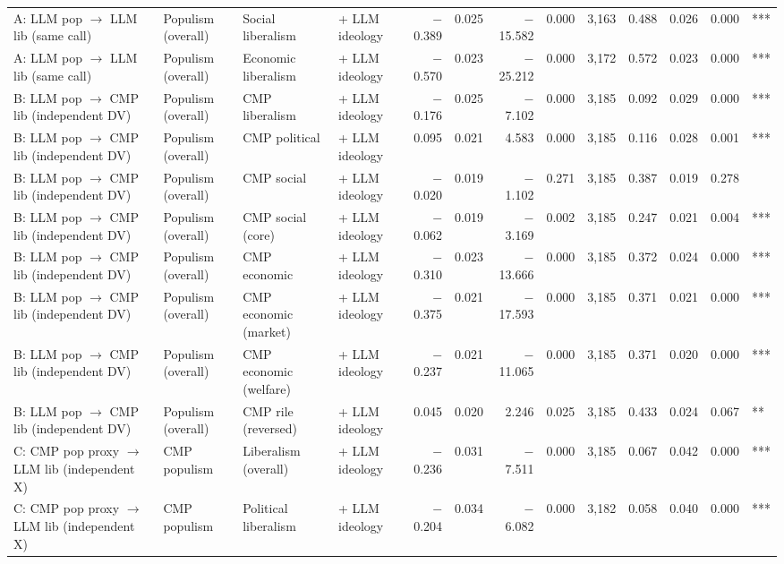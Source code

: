 \begin{table}[ht]
{\begin{tabular}{llllrrrrrrrrl}
A: LLM pop $\rightarrow$ LLM lib (same call) & Populism (overall) & Social liberalism & + LLM ideology & $-$0.389 & 0.025 & $-$15.582 & 0.000 & 3,163 & 0.488 & 0.026 & 0.000 & *** \\
A: LLM pop $\rightarrow$ LLM lib (same call) & Populism (overall) & Economic liberalism & + LLM ideology & $-$0.570 & 0.023 & $-$25.212 & 0.000 & 3,172 & 0.572 & 0.023 & 0.000 & *** \\
B: LLM pop $\rightarrow$ CMP lib (independent DV) & Populism (overall) & CMP liberalism & + LLM ideology & $-$0.176 & 0.025 & $-$7.102 & 0.000 & 3,185 & 0.092 & 0.029 & 0.000 & *** \\
B: LLM pop $\rightarrow$ CMP lib (independent DV) & Populism (overall) & CMP political & + LLM ideology & 0.095 & 0.021 & 4.583 & 0.000 & 3,185 & 0.116 & 0.028 & 0.001 & *** \\
B: LLM pop $\rightarrow$ CMP lib (independent DV) & Populism (overall) & CMP social & + LLM ideology & $-$0.020 & 0.019 & $-$1.102 & 0.271 & 3,185 & 0.387 & 0.019 & 0.278 &  \\
B: LLM pop $\rightarrow$ CMP lib (independent DV) & Populism (overall) & CMP social (core) & + LLM ideology & $-$0.062 & 0.019 & $-$3.169 & 0.002 & 3,185 & 0.247 & 0.021 & 0.004 & *** \\
B: LLM pop $\rightarrow$ CMP lib (independent DV) & Populism (overall) & CMP economic & + LLM ideology & $-$0.310 & 0.023 & $-$13.666 & 0.000 & 3,185 & 0.372 & 0.024 & 0.000 & *** \\
B: LLM pop $\rightarrow$ CMP lib (independent DV) & Populism (overall) & CMP economic (market) & + LLM ideology & $-$0.375 & 0.021 & $-$17.593 & 0.000 & 3,185 & 0.371 & 0.021 & 0.000 & *** \\
B: LLM pop $\rightarrow$ CMP lib (independent DV) & Populism (overall) & CMP economic (welfare) & + LLM ideology & $-$0.237 & 0.021 & $-$11.065 & 0.000 & 3,185 & 0.371 & 0.020 & 0.000 & *** \\
B: LLM pop $\rightarrow$ CMP lib (independent DV) & Populism (overall) & CMP rile (reversed) & + LLM ideology & 0.045 & 0.020 & 2.246 & 0.025 & 3,185 & 0.433 & 0.024 & 0.067 & ** \\
C: CMP pop proxy $\rightarrow$ LLM lib (independent X) & CMP populism & Liberalism (overall) & + LLM ideology & $-$0.236 & 0.031 & $-$7.511 & 0.000 & 3,185 & 0.067 & 0.042 & 0.000 & *** \\
C: CMP pop proxy $\rightarrow$ LLM lib (independent X) & CMP populism & Political liberalism & + LLM ideology & $-$0.204 & 0.034 & $-$6.082 & 0.000 & 3,182 & 0.058 & 0.040 & 0.000 & *** \\

\end{tabular}}
\end{table}
